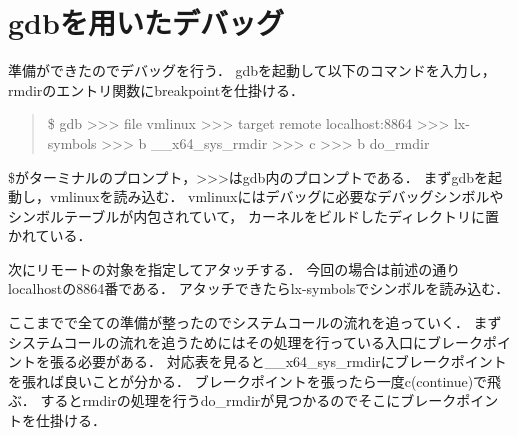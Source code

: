 \section{gdbを用いたデバッグ}
準備ができたのでデバッグを行う．
gdbを起動して以下のコマンドを入力し，rmdirのエントリ関数にbreakpointを仕掛ける．
\begin{quote}
\$ gdb 
>>> file vmlinux
>>> target remote localhost:8864
>>> lx-symbols
>>> b __x64_sys_rmdir 
>>> c
>>> b do_rmdir 
\end{quote}

\$がターミナルのプロンプト，>>>はgdb内のプロンプトである．
まずgdbを起動し，vmlinuxを読み込む．
vmlinuxにはデバッグに必要なデバッグシンボルやシンボルテーブルが内包されていて，
カーネルをビルドしたディレクトリに置かれている．

次にリモートの対象を指定してアタッチする．
今回の場合は前述の通りlocalhostの8864番である．
アタッチできたらlx-symbolsでシンボルを読み込む．

ここまでで全ての準備が整ったのでシステムコールの流れを追っていく．
まずシステムコールの流れを追うためにはその処理を行っている入口にブレークポイントを張る必要がある．
対応表を見ると__x64_sys_rmdirにブレークポイントを張れば良いことが分かる．\cite{syscall}
ブレークポイントを張ったら一度c(continue)で飛ぶ．
するとrmdirの処理を行うdo_rmdirが見つかるのでそこにブレークポイントを仕掛ける．


